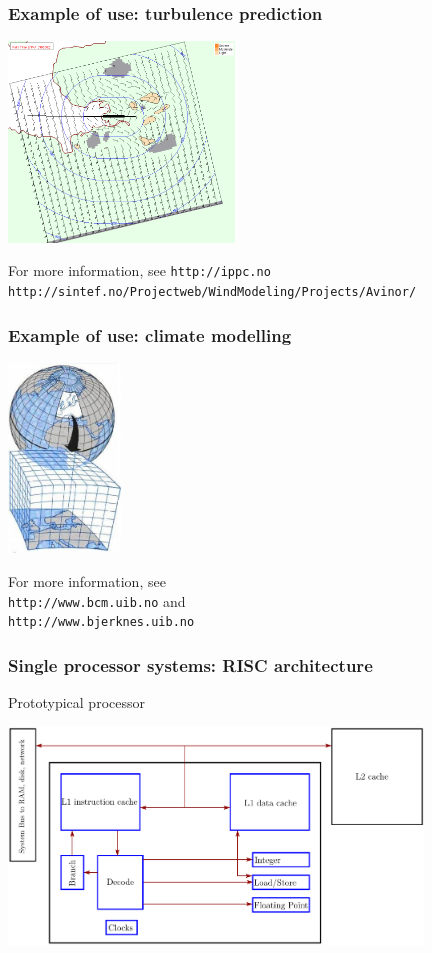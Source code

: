 \documentclass{beamer}
\begin{document}
\begin{frame}\frametitle{Example of use: turbulence prediction}
\begin{center}
\includegraphics[width=6cm]{simra}
\end{center}
For more information, see \texttt{http://ippc.no} \\
\texttt{http://sintef.no/Projectweb/WindModeling/Projects/Avinor/}
\end{frame}

\begin{frame}\frametitle{Example of use: climate modelling}
\begin{center}
\includegraphics[width=3cm]{climate_model}
\end{center}
For more information, see \\
\texttt{http://www.bcm.uib.no} and \\
\texttt{http://www.bjerknes.uib.no}
\end{frame}

\begin{frame}\frametitle{Single processor systems: RISC architecture}
Prototypical processor
\begin{center}
\includegraphics[width=11cm]{Lande}
\end{center}
\end{frame}
\end{document}
